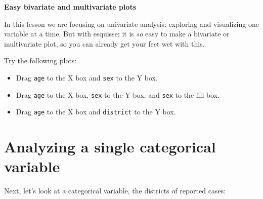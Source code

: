 \documentclass[
  letterpaper,
  DIV=11,
  numbers=noendperiod]{scrreprt}
\newenvironment{Shaded}{\begin{snugshade}}{\end{snugshade}}
\newcommand{\DocumentationTok}[1]{\textcolor[rgb]{0.37,0.37,0.37}{\textit{#1}}}
\newcommand{\NormalTok}[1]{\textcolor[rgb]{0.00,0.23,0.31}{#1}}
\newcommand{\SpecialCharTok}[1]{\textcolor[rgb]{0.37,0.37,0.37}{#1}}
\begin{document}
\begin{tcolorbox}[enhanced jigsaw, colframe=quarto-callout-note-color-frame, rightrule=.15mm, opacityback=0, breakable, coltitle=black, colbacktitle=quarto-callout-note-color!10!white, bottomrule=.15mm, leftrule=.75mm, toprule=.15mm, arc=.35mm, bottomtitle=1mm, colback=white, left=2mm, opacitybacktitle=0.6, titlerule=0mm, title=\textcolor{quarto-callout-note-color}{\faInfo}\hspace{0.5em}{Challenge}, toptitle=1mm]

\textbf{Easy bivariate and multivariate plots}

In this lesson we are focusing on univariate analysis: exploring and
visualizing one variable at a time. But with esquisse; it is \emph{so}
easy to make a bivariate or multivariate plot, so you can already get
your feet wet with this.

Try the following plots:

\begin{itemize}
\item
  Drag \texttt{age} to the X box and \texttt{sex} to the Y box.
\item
  Drag \texttt{age} to the X box, \texttt{sex} to the Y box, and
  \texttt{sex} to the fill box.
\item
  Drag \texttt{age} to the X box and \texttt{district} to the Y box.
\end{itemize}

\end{tcolorbox}

\hypertarget{analyzing-a-single-categorical-variable}{%
\section{Analyzing a single categorical
variable}\label{analyzing-a-single-categorical-variable}}

Next, let's look at a categorical variable, the districts of reported
cases:

\begin{Shaded}
\end{Shaded}
\end{document}

